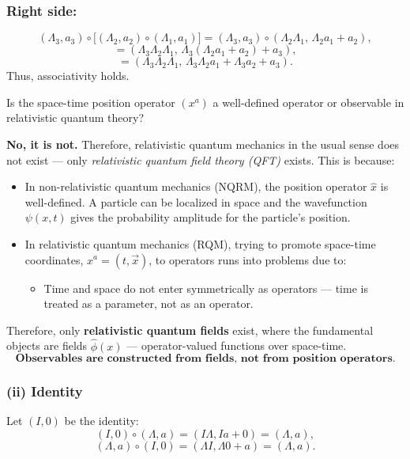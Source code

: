 \documentclass[14pt]{article} %
\begin{document}
\subsubsection*{Right side:}
\[
(\Lambda_3,a_3)\circ \bigl[(\Lambda_2,a_2)\circ (\Lambda_1,a_1)\bigr] 
= (\Lambda_3,a_3)\circ (\Lambda_2 \Lambda_1, \, \Lambda_2 a_1 + a_2),
\]
\[
= (\Lambda_3 \Lambda_2 \Lambda_1, \, \Lambda_3 (\Lambda_2 a_1 + a_2) + a_3),
\]
\[
= (\Lambda_3 \Lambda_2 \Lambda_1, \, \Lambda_3 \Lambda_2 a_1 + \Lambda_3 a_2 + a_3).
\]
Thus, associativity holds.
\begin{tcolorbox}
[ title=\textbf{Note:}]

Is the space-time position operator $(x^a)$ a well-defined operator or observable in relativistic quantum theory? 

\medskip

\noindent \textbf{No, it is not.} Therefore, relativistic quantum mechanics in the usual sense does not exist — only \textit{relativistic quantum field theory (QFT)} exists. This is because:

\begin{itemize}
    \item [1.] In non-relativistic quantum mechanics (NQRM), the position operator $\hat{x}$ is well-defined. A particle can be localized in space and the wavefunction $\psi(x,t)$ gives the probability amplitude for the particle's position.
    
    \item [2.] In relativistic quantum mechanics (RQM), trying to promote space-time coordinates, $x^a = (t, \vec{x})$, to operators runs into problems due to:    
    \begin{itemize}
        \item Time and space do not enter symmetrically as operators — time is treated as a parameter, not as an operator.
    \end{itemize}
\end{itemize}

\noindent Therefore, only \textbf{relativistic quantum fields} exist, where the fundamental objects are fields $\hat{\phi}(x)$ — operator-valued functions over space-time.
$$\textbf{Observables are constructed from fields, not from position operators.}$$
\end{tcolorbox}

\subsubsection*{(ii) Identity}
Let $(I,0)$ be the identity:
\[
(I,0)\circ (\Lambda,a) = (I\Lambda, Ia+0) = (\Lambda,a),
\]
\[
(\Lambda,a)\circ (I,0) = (\Lambda I, \Lambda 0 + a) = (\Lambda,a).
\]
\end{document}
